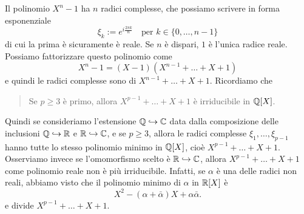 \begin{esem}
Il polinomio \(X^n-1\) ha \(n\) radici complesse, che possiamo scrivere in forma esponenziale %
\[\xi_k := e^{i\frac{2\pi k}n} \quad \text{per } k \in \{0, \dots{}, n-1\}\]
di cui la prima è sicuramente è reale. Se \(n\) è dispari, \(1\) è l'unica radice reale. Possiamo fattorizzare questo polinomio come
\[X^n - 1 = (X-1) \left(X^{n-1} + \dots{} + X + 1\right)\]
e quindi le radici complesse sono di \(X^{n-1} + \dots{} + X + 1\). Ricordiamo che
\begin{quotation}
Se \(p \ge 3\) è primo, allora \(X^{p-1} + \dots{} + X + 1\) è irriducibile in \(\mathbb{Q}[X]\).
\end{quotation}
Quindi se consideriamo l'estensione \(\mathbb{Q} \hookrightarrow \mathbb{C}\) data dalla composizione delle inclusioni \(\mathbb{Q} \hookrightarrow \mathbb{R}\) e \(\mathbb{R} \hookrightarrow \mathbb{C}\), e se \(p \ge 3\), allora le radici complesse \(\xi_1, \dots{}, \xi_{p-1}\) hanno tutte lo stesso polinomio minimo in \(\mathbb{Q}[X]\), cioè \(X^{p-1} + \dots{} + X + 1\). Osserviamo invece se l'omomorfismo scelto è \(\mathbb{R} \hookrightarrow \mathbb{C}\), allora \(X^{p-1} + \dots{} + X + 1\) come polinomio reale non è più irriducibile. Infatti, se \(\alpha\) è una delle radici non reali, abbiamo visto che il polinomio minimo di \(\alpha\) in \(\mathbb{R}[X]\) è
\[X^2 - (\alpha + \bar\alpha)X + \alpha \bar\alpha .\]
e divide \(X^{p-1} + \dots{} + X + 1\).
\end{esem}
